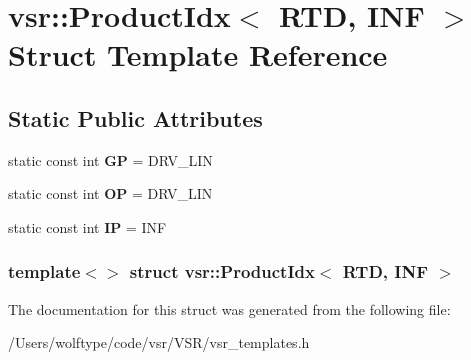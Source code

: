 \hypertarget{structvsr_1_1_product_idx_3_01_r_t_d_00_01_i_n_f_01_4}{\section{vsr\-:\-:Product\-Idx$<$ R\-T\-D, I\-N\-F $>$ Struct Template Reference}
\label{structvsr_1_1_product_idx_3_01_r_t_d_00_01_i_n_f_01_4}
}
\subsection*{Static Public Attributes}
\begin{DoxyCompactItemize}
\item 
\hypertarget{structvsr_1_1_product_idx_3_01_r_t_d_00_01_i_n_f_01_4_a6909ca1bcc1eb0934ca50e124ec4e829}{static const int {\bfseries G\-P} = D\-R\-V\-\_\-\-L\-I\-N}\label{structvsr_1_1_product_idx_3_01_r_t_d_00_01_i_n_f_01_4_a6909ca1bcc1eb0934ca50e124ec4e829}

\item 
\hypertarget{structvsr_1_1_product_idx_3_01_r_t_d_00_01_i_n_f_01_4_a78d499d88a809b6b4dccfd7cadffbbd5}{static const int {\bfseries O\-P} = D\-R\-V\-\_\-\-L\-I\-N}\label{structvsr_1_1_product_idx_3_01_r_t_d_00_01_i_n_f_01_4_a78d499d88a809b6b4dccfd7cadffbbd5}

\item 
\hypertarget{structvsr_1_1_product_idx_3_01_r_t_d_00_01_i_n_f_01_4_ac4597800a8210114ea8ea8b67e93d55d}{static const int {\bfseries I\-P} = I\-N\-F}\label{structvsr_1_1_product_idx_3_01_r_t_d_00_01_i_n_f_01_4_ac4597800a8210114ea8ea8b67e93d55d}

\end{DoxyCompactItemize}
\subsubsection*{template$<$$>$ struct vsr\-::\-Product\-Idx$<$ R\-T\-D, I\-N\-F $>$}



The documentation for this struct was generated from the following file\-:\begin{DoxyCompactItemize}
\item 
/\-Users/wolftype/code/vsr/\-V\-S\-R/vsr\-\_\-templates.\-h\end{DoxyCompactItemize}

